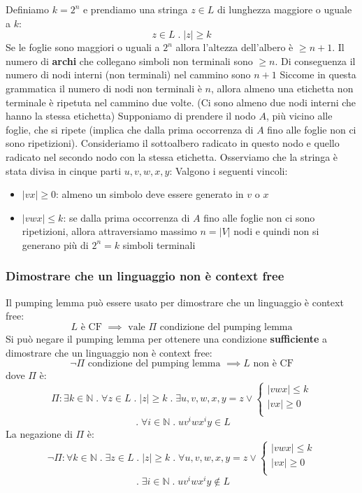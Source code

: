 \documentclass[a4paper]{article}
\begin{document}
\vspace{1em}
\noindent
Definiamo \( k = 2^n \) e prendiamo una stringa \( z \in L \) di lunghezza maggiore o
uguale a \( k \):
\[
  z \in L \;.\; \left| z \right| \ge k
\] 
Se le foglie sono maggiori o uguali a \( 2^n \) allora l'altezza dell'albero
è \( \ge n+1 \). Il numero di \textbf{archi} che collegano simboli non terminali sono \( \ge n \).
Di conseguenza il numero di nodi interni (non terminali) nel cammino sono \( n+1 \) 
\label{04-11-D3}
Siccome in questa grammatica il numero di nodi non terminali è \( n \), allora almeno
una etichetta non terminale è ripetuta nel cammino due volte. (Ci sono almeno due nodi
interni che hanno la stessa etichetta)
\label{04-11-D4}
Supponiamo di prendere il nodo \( A \), più vicino alle foglie, che si ripete (implica che
dalla prima occorrenza di \( A \) fino alle foglie non ci sono ripetizioni). Consideriamo
il sottoalbero radicato in questo nodo e quello radicato nel secondo nodo con la stessa etichetta.
Osserviamo che la stringa è stata divisa in cinque parti \( u, v, w, x, y \):
\label{04-11-D5}
Valgono i seguenti vincoli:
\begin{itemize}
  \item \( \left| vx \right| \ge 0 \): almeno un simbolo deve essere generato in \( v \) 
    o \( x \)

  \item \( \left| vwx \right| \le k \): se dalla prima occorrenza di \( A \) fino
    alle foglie non ci sono ripetizioni, allora attraversiamo massimo \( n = \left| V \right|  \) 
    nodi e quindi non si generano più di \( 2^n = k \) simboli terminali
\end{itemize}
\label{04-11-D6}

\subsubsection{Dimostrare che un linguaggio non è context free}
Il pumping lemma può essere usato per dimostrare che un linguaggio è context free:
\[
  L \text{ è CF } \implies \text{ vale } \Pi \text{ condizione del pumping lemma}
\] 
Si può negare il pumping lemma per ottenere una condizione \textbf{sufficiente} a
dimostrare che un linguaggio non è context free:
\[
  \neg \Pi \text{ condizione del pumping lemma } \implies L \text{ non è CF}
\]
dove \( \Pi  \) è:
\[
  \Pi: \exists k \in \mathbb{N} \;.\; \forall z \in L \;.\; \left| z \right| \ge k
  \;.\; \exists u, v, w, x, y = z \vee
  \begin{cases}
    \left| vwx \right| \le  k \\
    \left| vx \right| \ge 0 \\
  \end{cases}
\] 
\[
    \;.\; \forall i \in \mathbb{N} \;.\; u v^i w x^i y \in L
\] 
La negazione di \( \Pi  \) è:
\[
  \neg \Pi: \forall k \in \mathbb{N} \;.\; \exists z \in L \;.\; \left| z \right| \ge k
  \;.\; \forall u, v, w, x, y = z \vee
  \begin{cases}
    \left| vwx \right| \le  k \\
    \left| vx \right| \ge 0 \\
  \end{cases}
\] 
\[
    \;.\; \exists i \in \mathbb{N} \;.\; u v^i w x^i y \notin L
\]
\label{04-11-D7}
\end{document}
